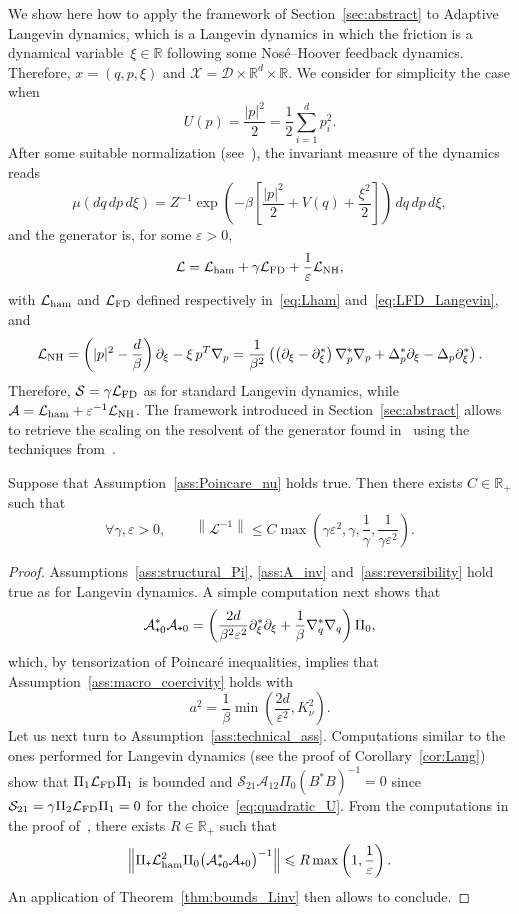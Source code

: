 \documentclass[10pt]{amsart}
\theoremstyle{definition}\newtheorem{defi}[theo]{Definition}\newtheorem{rema}[theo]{Remark}\newtheorem{exam}[theo]{Example}\newtheorem{exem}[theo]{Example}\newtheorem{nota}[theo]{Notation}
\newcommand{\cL}{\mathcal{L}}
\newcommand{\cLs}{\mathcal{S}}
\newcommand{\cLa}{\mathcal{A}}
\newcommand{\cX}{\mathcal{X}}
\newcommand{\cD}{\mathcal{D}}
\newcommand{\R}{\mathbb{R}}
\newcommand{\cLham}{\mathcal{L}_{\rm ham}}
\newcommand{\cLFD}{\mathcal{L}_{\rm FD}}
\newcommand{\subplus}{\textnormal{\texttt{+}}}
\renewcommand{\leq}{\leqslant}
\newcommand{\cLNH}{\cL_{\rm NH}}
\let\oldforall\forall
\renewcommand*{\forall}{\mathrel{\oldforall}}
\begin{document}
We show here how to apply the framework of Section~\ref{sec:abstract} to Adaptive Langevin dynamics, which is a Langevin dynamics in which the friction is a dynamical variable~$\xi \in \R$ following some Nosé--Hoover feedback dynamics. Therefore, $x = (q,p,\xi)$ and $\cX = \cD \times \R^d \times \R$. We consider for simplicity the case when
\begin{equation}\label{eq:quadratic_U}
U(p) = \frac{|p|^2}{2} = \frac12 \sum_{i=1}^d p_i^2.
\end{equation}
After some suitable normalization (see~\cite{LSS19}), the invariant measure of the dynamics reads
\[
\mu(dq \, dp \, d\xi) = Z^{-1} \exp\left(-\beta \left [\frac{|p|^2}{2} + V(q) + \frac{\xi^2}{2} \right]\right) \, dq \, dp \, d\xi,
\]
and the generator is, for some $\varepsilon > 0$,
\[
\cL = \cLham + \gamma \cLFD + \frac{1}{\varepsilon} \cLNH,
\]
with $\cLham$ and $\cLFD$ defined respectively in~\eqref{eq:Lham} and~\eqref{eq:LFD_Langevin}, and
\[
\cLNH = \left (|p|^{2} - \frac{d}{\beta} \right) \partial_{\xi} - \xi\, p^T \nabla_{p} = \frac{1}{\beta^2} \left(\left(\partial_\xi-\partial_\xi^*\right)\nabla_p^*\nabla_p + \Delta_p^*\partial_\xi - \Delta_p\partial_\xi^* \right).
\]
Therefore, $\cLs = \gamma \cLFD$ as for standard Langevin dynamics, while $\cLa = \cLham + \varepsilon^{-1} \cLNH$. The framework introduced in Section~\ref{sec:abstract} allows to retrieve the scaling on the resolvent of the generator found in~\cite{LSS19} using the techniques from~\cite{DMS15,Herau06}.

\begin{prop}
Suppose that Assumption~\ref{ass:Poincare_nu} holds true. Then there exists $C \in \R_+$ such that
\[
\forall \gamma,\varepsilon>0, \qquad \left\|\cL^{-1}\right\| \leq C\max\left(\gamma\varepsilon^2,\gamma,\frac1\gamma,\frac{1}{\gamma\varepsilon^2}\right).
\]
\end{prop}

\begin{proof}
Assumptions~\ref{ass:structural_Pi}, \ref{ass:A_inv} and~\ref{ass:reversibility} hold true as for Langevin dynamics. A simple computation next shows that
\[
\cLa_{\subplus 0}^*\cLa_{\subplus 0} = \left (\frac{2d}{\beta^2 \varepsilon^2} \partial_{\xi}^{*}\partial_{\xi} + \frac1\beta \nabla_{q}^{*}\nabla_{q} \right) \Pi_0,
\]
which, by tensorization of Poincaré inequalities, implies that Assumption~\ref{ass:macro_coercivity} holds with
\[
a^2 = \frac1\beta \min\left(\frac{2d}{\varepsilon^2},K_\nu^2\right).
\]
Let us next turn to Assumption~\ref{ass:technical_ass}. Computations similar to the ones performed for Langevin dynamics (see the proof of Corollary~\ref{cor:Lang}) show that $\Pi_1 \cLFD \Pi_1$ is bounded and $\cLs_{21} \cLa_{12} \Pi_0 (B^* B)^{-1} = 0$ since $\cLs_{21} = \gamma \Pi_2 \cLFD \Pi_1 = 0$ for the choice~\eqref{eq:quadratic_U}. From the computations in the proof of~\cite[Lemma~2.7]{LSS19}, there exists $R \in \R_+$ such that
\[
\left\| \Pi_\subplus\cLham^2 \Pi_0 \big(\cLa_{\subplus 0}^*\cLa_{\subplus 0}\big)^{-1} \right\| \leq R \max\left(1,\frac1\varepsilon\right).
\]
An application of Theorem~\ref{thm:bounds_Linv} then allows to conclude.
\end{proof}
\end{document}
